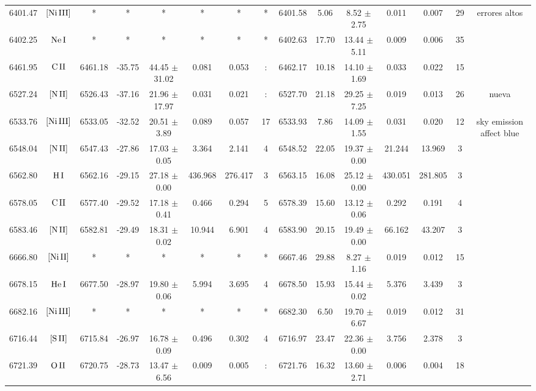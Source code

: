 \documentclass{article}
\begin{document}
\begin{table*}
\begin{adjustbox}{width=\textwidth}
\begin{tabular}{ccccccccccccccc}
6401.47 & $\mbox{[Ni}\thinspace \mbox{III]}$ & * & * & * & * & * & * & 6401.58 & 5.06 & 8.52 $\pm$ 2.75 & 0.011 & 0.007 & 29 &  errores altos \\
6402.25 & $\mbox{Ne}\thinspace \mbox{I}$ & * & * & * & * & * & * & 6402.63 & 17.70 & 13.44 $\pm$ 5.11 & 0.009 & 0.006 & 35 &  \\
6461.95 & $\mbox{C}\thinspace \mbox{II}$ & 6461.18 & -35.75 & 44.45 $\pm$ 31.02 & 0.081 & 0.053 & : & 6462.17 & 10.18 & 14.10 $\pm$ 1.69 & 0.033 & 0.022 & 15 &  \\
6527.24 & $\mbox{[N}\thinspace \mbox{II]}$ & 6526.43 & -37.16 & 21.96 $\pm$ 17.97 & 0.031 & 0.021 & : & 6527.70 & 21.18 & 29.25 $\pm$ 7.25 & 0.019 & 0.013 & 26 &  nueva \\
6533.76 & $\mbox{[Ni}\thinspace \mbox{III]}$ & 6533.05 & -32.52 & 20.51 $\pm$ 3.89 & 0.089 & 0.057 & 17 & 6533.93 & 7.86 & 14.09 $\pm$ 1.55 & 0.031 & 0.020 & 12 &  sky emission affect blue \\
6548.04 & $\mbox{[N}\thinspace \mbox{II]}$ & 6547.43 & -27.86 & 17.03 $\pm$ 0.05 & 3.364 & 2.141 & 4 & 6548.52 & 22.05 & 19.37 $\pm$ 0.00 & 21.244 & 13.969 & 3 &  \\
6562.80 & $\mbox{H}\thinspace \mbox{I}$ & 6562.16 & -29.15 & 27.18 $\pm$ 0.00 & 436.968 & 276.417 & 3 & 6563.15 & 16.08 & 25.12 $\pm$ 0.00 & 430.051 & 281.805 & 3 &  \\
6578.05 & $\mbox{C}\thinspace \mbox{II}$ & 6577.40 & -29.52 & 17.18 $\pm$ 0.41 & 0.466 & 0.294 & 5 & 6578.39 & 15.60 & 13.12 $\pm$ 0.06 & 0.292 & 0.191 & 4 &  \\
6583.46 & $\mbox{[N}\thinspace \mbox{II]}$ & 6582.81 & -29.49 & 18.31 $\pm$ 0.02 & 10.944 & 6.901 & 4 & 6583.90 & 20.15 & 19.49 $\pm$ 0.00 & 66.162 & 43.207 & 3 &  \\
6666.80 & $\mbox{[Ni}\thinspace \mbox{II]}$ & * & * & * & * & * & * & 6667.46 & 29.88 & 8.27 $\pm$ 1.16 & 0.019 & 0.012 & 15 &  \\
6678.15 & $\mbox{He}\thinspace \mbox{I}$ & 6677.50 & -28.97 & 19.80 $\pm$ 0.06 & 5.994 & 3.695 & 4 & 6678.50 & 15.93 & 15.44 $\pm$ 0.02 & 5.376 & 3.439 & 3 &  \\
6682.16 & $\mbox{[Ni}\thinspace \mbox{III]}$ & * & * & * & * & * & * & 6682.30 & 6.50 & 19.70 $\pm$ 6.67 & 0.019 & 0.012 & 31 &  \\
6716.44 & $\mbox{[S}\thinspace \mbox{II]}$ & 6715.84 & -26.97 & 16.78 $\pm$ 0.09 & 0.496 & 0.302 & 4 & 6716.97 & 23.47 & 22.36 $\pm$ 0.00 & 3.756 & 2.378 & 3 &  \\
6721.39 & $\mbox{O}\thinspace \mbox{II}$ & 6720.75 & -28.73 & 13.47 $\pm$ 6.56 & 0.009 & 0.005 & : & 6721.76 & 16.32 & 13.60 $\pm$ 2.71 & 0.006 & 0.004 & 18 &  \\

\end{tabular}
\end{adjustbox}
\end{table*}
\end{document}
